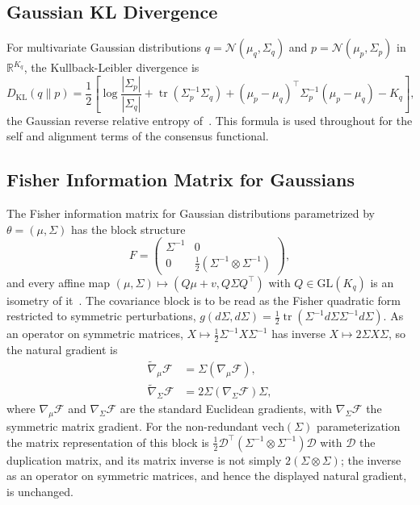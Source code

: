 \subsection{Gaussian KL Divergence}
\label{app:gaussian_kl}

For multivariate Gaussian distributions $q = \mathcal{N}(\mu_q, \Sigma_q)$ and $p = \mathcal{N}(\mu_p, \Sigma_p)$ in $\mathbb{R}^{K_q}$, the Kullback-Leibler divergence is
\begin{equation}
D_{\mathrm{KL}}(q \| p) = \frac{1}{2}\left[\log\frac{|\Sigma_p|}{|\Sigma_q|} + \operatorname{tr}(\Sigma_p^{-1}\Sigma_q) + (\mu_p - \mu_q)^\top\Sigma_p^{-1}(\mu_p - \mu_q) - K_q\right],
\end{equation}
the Gaussian reverse relative entropy of~\cite[Ch.~G4]{DennisGaugeVFESuppG2026}. This formula is used throughout for the self and alignment terms of the consensus functional.

\subsection{Fisher Information Matrix for Gaussians}
\label{app:fisher_gaussian}

The Fisher information matrix for Gaussian distributions parametrized by $\theta = (\mu, \Sigma)$ has the block structure
\begin{equation}
F = \begin{pmatrix}
\Sigma^{-1} & 0 \\
0 & \frac{1}{2}(\Sigma^{-1} \otimes \Sigma^{-1})
\end{pmatrix},
\end{equation}
and every affine map $(\mu, \Sigma) \mapsto (Q\mu + v, Q\Sigma Q^\top)$ with $Q \in \mathrm{GL}(K_q)$ is an isometry of it~\cite[Ch.~G5, Fisher metric in the moment chart]{DennisGaugeVFESuppG2026}. The covariance block is to be read as the Fisher quadratic form restricted to symmetric perturbations, $g(d\Sigma, d\Sigma) = \tfrac{1}{2}\operatorname{tr}(\Sigma^{-1} d\Sigma \Sigma^{-1} d\Sigma)$. As an operator on symmetric matrices, $X \mapsto \tfrac{1}{2}\Sigma^{-1}X\Sigma^{-1}$ has inverse $X \mapsto 2\Sigma X \Sigma$, so the natural gradient is
\begin{align}
\tilde{\nabla}_\mu \mathcal{F} &= \Sigma (\nabla_\mu \mathcal{F}), \\
\tilde{\nabla}_\Sigma \mathcal{F} &= 2\Sigma (\nabla_\Sigma \mathcal{F}) \Sigma,
\end{align}
where $\nabla_\mu \mathcal{F}$ and $\nabla_\Sigma \mathcal{F}$ are the standard Euclidean gradients, with $\nabla_\Sigma \mathcal{F}$ the symmetric matrix gradient. For the non-redundant $\mathrm{vech}(\Sigma)$ parameterization the matrix representation of this block is $\tfrac{1}{2}\mathcal{D}^\top(\Sigma^{-1} \otimes \Sigma^{-1})\mathcal{D}$ with $\mathcal{D}$ the duplication matrix, and its matrix inverse is not simply $2(\Sigma \otimes \Sigma)$; the inverse as an operator on symmetric matrices, and hence the displayed natural gradient, is unchanged.


